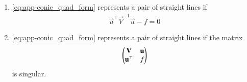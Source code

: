 \begin{enumerate}[label=\thesubsection.\arabic*.,ref=\thesubsection.\theenumi]
  \begin{proof}
	  From 
\eqref{eq:app-conic_simp_temp_nonparab},
it is obvious that 
the pair of lines represented by 
  \begin{align}
	    \vec{y}^{\top}\vec{D}\vec{y} = 0   
      \label{eq:pair-conic}
  \end{align}
  do not intersect the conic 
  \begin{align}
	    \vec{y}^{\top}\vec{D}\vec{y} =  f_0  
  \end{align}
  Thus, 
      \eqref{eq:pair-conic}
      represents the asysmptotes of the hyperbola in 
\eqref{eq:app-conic_simp_temp_nonparab} and can be expressed as 
  \begin{align} 
    \lambda_1y_1^2 +\lambda_2y_1^2 = 0, 
    \label{eq:quad_form_hyper}
    \end{align}
which can then be simplified  
using the steps in 
	\eqref{eq:incircle-disc-v}-
	\eqref{eq:incircle-disc-v-lam}
to obtain
    \eqref{eq:app-pair-std}.
  \end{proof}
  \item
\eqref{eq:app-conic_quad_form} represents a pair of straight lines if 
  \begin{align} 
	  \label{eq:pair-cond}
  \vec{u}^{\top}\vec{V}^{-1}\vec{u} -f  = 0
  \end{align} 
  
  \item
\eqref{eq:app-conic_quad_form} represents a pair of straight lines if 
the matrix 
  \begin{align} 
	  \begin{pmatrix}\mathbf{V} & \mathbf{u}\\ \mathbf{u}^{\top} & f\end{pmatrix}  
  \end{align} 
  is singular.
  

\end{enumerate}
